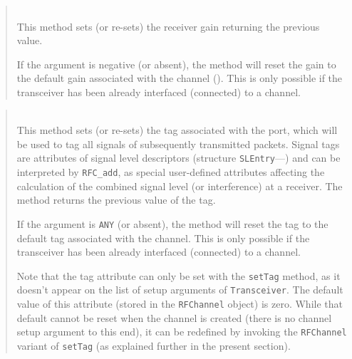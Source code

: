 \begin{quote}
\noindent{} \hspace{0in}\vspace{0.05in}\\
\noindent
This method sets (or re-sets) the receiver gain
returning the previous value.

\noindent
If the argument is negative (or absent), the method will reset
the gain to the default gain
associated with the channel ().
This is only possible if the transceiver has been already interfaced (connected)
to a channel.
\end{quote}

\begin{quote}
\noindent{} \hspace{0in}\vspace{0.05in}\\
\noindent
This method sets (or re-sets) the tag associated with the port, which will be
used to tag all signals of subsequently transmitted packets.
Signal tags are attributes of signal level descriptors (structure
{\tt SLEntry}---)
and can be interpreted by {\tt RFC\_add}, as special user-defined
attributes affecting the calculation of the combined signal level
(or interference) at a receiver.
The method returns the previous value of the tag.

\noindent
If the argument is {\tt ANY} (or absent), the method will reset
the tag to the default tag
associated with the channel.
This is only possible if the transceiver has been already interfaced (connected)
to a channel.

\noindent
Note that the tag attribute can only be set with the {\tt setTag} method, as it
doesn't appear on the list of setup arguments of {\tt Transceiver}.
The default value of this attribute (stored in the {\tt RFChannel} object) is
zero.
While that default cannot be reset when the channel is created (there is no
channel setup argument to this end), it can be redefined by invoking the
{\tt RFChannel} variant of {\tt setTag} (as explained further in the present
section).
\end{quote}

